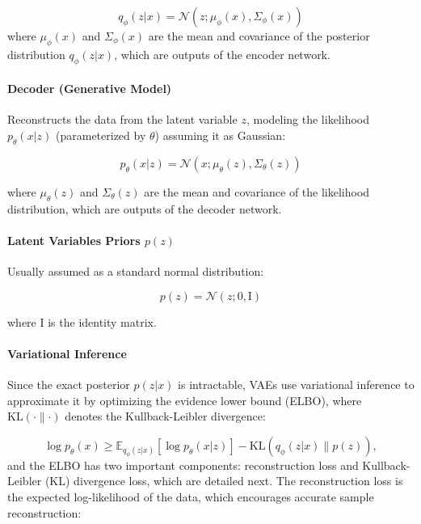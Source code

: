 \documentclass{ieeeaccess}
\begin{document}
\begin{equation}
q_\phi(z | x) = \mathcal{N}(z; \mu_\phi(x), \Sigma_\phi(x))
\end{equation}
where $\mu_\phi(x)$ and $\Sigma_\phi(x)$ are the mean and covariance of the posterior distribution $q_\phi(z | x)$, which are outputs of the encoder network.

\paragraph{Decoder (Generative Model)}
Reconstructs the data from the latent variable $z$, modeling the likelihood $p_\theta(x | z)$ (parameterized by $\theta$) assuming it as Gaussian:

\begin{equation}
p_\theta(x | z) = \mathcal{N}(x; \mu_\theta(z), \Sigma_\theta(z))
\end{equation}

where $\mu_\theta(z)$ and $\Sigma_\theta(z)$ are the mean and covariance of the likelihood distribution, which are outputs of the decoder network.

\paragraph{Latent Variables Priors $p(z)$}
Usually assumed as a standard normal distribution:

\begin{equation}
p(z) = \mathcal{N}(z; 0, \mathrm{I})
\end{equation}

where $\mathrm{I}$ is the identity matrix.

\paragraph{Variational Inference} Since the exact posterior $p(z | x)$ is intractable, VAEs use variational inference to approximate it by optimizing the evidence lower bound (ELBO), where $\text{KL}(\cdot \parallel \cdot)$ denotes the Kullback-Leibler divergence:

\begin{equation}
\log p_\theta(x) \geq \mathbb{E}_{q_\phi(z | x)} \left[ \log p_\theta(x | z) \right] - \text{KL}(q_\phi(z | x) \parallel p(z)),
\end{equation}
and the ELBO has two important components: reconstruction loss and Kullback-Leibler (KL) divergence loss, which are detailed next. The reconstruction loss is the expected log-likelihood of the data, which encourages accurate sample reconstruction:
\end{document}
